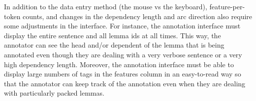 In addition to the data entry method (the mouse vs the keyboard), feature-per-token counts, and changes in the dependency length and arc direction also require some adjustments in the interface. For instance, the annotation interface must display the entire sentence and all lemma ids at all times. This way, the annotator can see the head and/or dependent of the lemma that is being annotated even though they are dealing with a very verbose sentence or a very high dependency length. Moreover, the annotation interface must be able to display large numbers of tags in the features column in an easy-to-read way so that the annotator can keep track of the annotation even when they are dealing with particularly packed lemmas.










